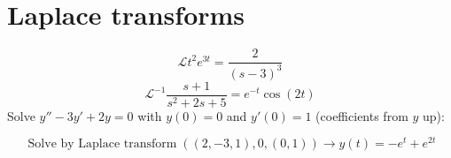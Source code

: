 \documentclass[11pt,a4paper]{article}
\theoremstyle{plain}
\theoremstyle{definition}
\theoremstyle{remark}
\begin{document}
\section*{Laplace transforms}

\begin{equation*}
  \mathcal{L} t^2 e^{3t} = \frac{2}{\left(s - 3\right)^{3}}
\end{equation*}
\begin{equation*}
  \mathcal{L}^{-1} \frac{s + 1}{s^2 + 2s + 5} = e^{-t} \cos\left(2 t\right)
\end{equation*}
Solve $y'' - 3y' + 2y = 0$ with $y(0) = 0$ and $y'(0) = 1$ (coefficients from $y$ up):

\begin{equation*}
  \operatorname{Solve\ by\ Laplace\ transform}((2, -3, 1), 0, (0, 1)) \to y\left(t\right) = -e^{t} + e^{2 t}
\end{equation*}
\end{document}
